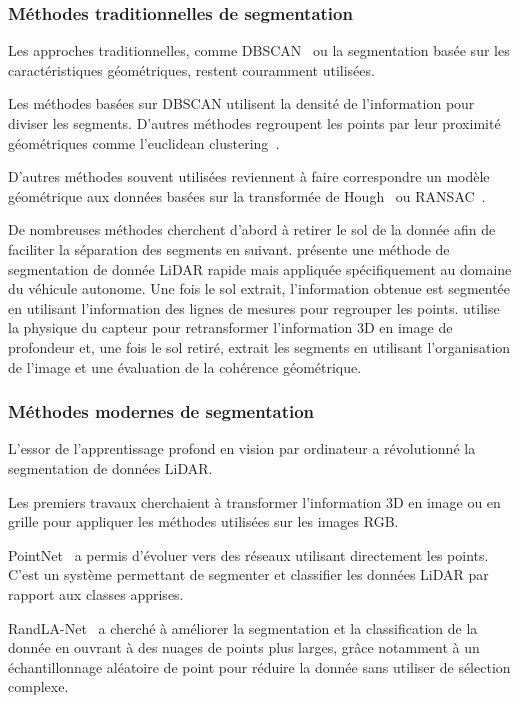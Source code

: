 \documentclass[a4paper, french, 10pt, onecolumn, notitlepage, roman]{article}
\begin{document}
\subsubsection{Méthodes traditionnelles de segmentation}
Les approches traditionnelles, comme DBSCAN~\cite{ester:ickddm:1996} ou la segmentation basée sur les caractéristiques géométriques, restent couramment utilisées.

Les méthodes basées sur DBSCAN utilisent la densité de l'information pour diviser les segments.
D'autres méthodes regroupent les points par leur proximité géométriques comme l'euclidean clustering~\cite{rusu:these:2009}.

D'autres méthodes souvent utilisées reviennent à faire correspondre un modèle géométrique aux données basées sur la transformée de Hough~\cite{hough::1962} ou RANSAC~\cite{fischler:acm:1981}.

De nombreuses méthodes cherchent d'abord à retirer le sol de la donnée afin de faciliter la séparation des segments en suivant.
\cite{zermas:icra:2017} présente une méthode de segmentation de donnée LiDAR rapide mais appliquée spécifiquement au domaine du véhicule autonome.
Une fois le sol extrait, l'information obtenue est segmentée en utilisant l'information des lignes de mesures pour regrouper les points.
\cite{bogoslavskyi:iros:2016} utilise la physique du capteur pour retransformer l'information 3D en image de profondeur et, une fois le sol retiré, extrait les segments en utilisant l'organisation de l'image et une évaluation de la cohérence géométrique.

\subsubsection{Méthodes modernes de segmentation}
L'essor de l'apprentissage profond en vision par ordinateur a révolutionné la segmentation de données LiDAR.

Les premiers travaux cherchaient à transformer l'information 3D en image ou en grille pour appliquer les méthodes utilisées sur les images RGB.

PointNet~\cite{qi:cvpr:2017,qi:arxiv:2017} a permis d'évoluer vers des réseaux utilisant directement les points.
C'est un système permettant de segmenter et classifier les données LiDAR par rapport aux classes apprises.

RandLA-Net~\cite{hu:cvpr:2020} a cherché à améliorer la segmentation et la classification de la donnée en ouvrant à des nuages de points plus larges, grâce notamment à un échantillonnage aléatoire de point pour réduire la donnée sans utiliser de sélection complexe.
\end{document}
